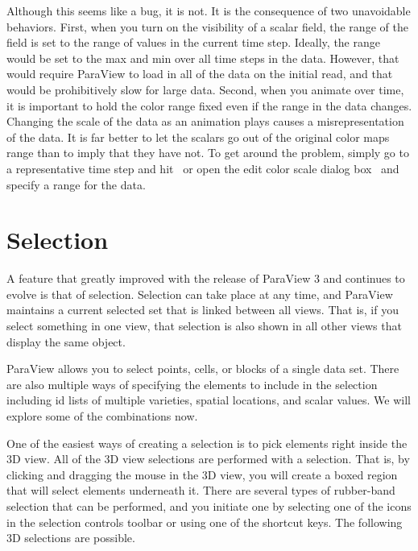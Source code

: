 Although this seems like a bug, it is not.  It is the consequence of two
unavoidable behaviors.  First, when you turn on the visibility of a scalar
field, the range of the field is set to the range of values in the current
time step.  Ideally, the range would be set to the max and min over all
time steps in the data.  However, that would require ParaView to load in
all of the data on the initial read, and that would be prohibitively slow
for large data.  Second, when you animate over time, it is important to
hold the color range fixed even if the range in the data changes.  Changing
the scale of the data as an animation plays causes a misrepresentation of
the data.  It is far better to let the scalars go out of the original color
maps range than to imply that they have not.  To get around the problem,
simply go to a representative time step and hit~ or
open the edit color scale dialog box~ and specify a
range for the data.


\section{Selection}

A feature that greatly improved with the release of ParaView 3 and
continues to evolve is that of selection.  Selection can take place at any
time, and ParaView maintains a current selected set that is linked between
all views.  That is, if you select something in one view, that selection is
also shown in all other views that display the same object.

ParaView allows you to select points, cells, or blocks of a single data
set.  There are also multiple ways of specifying the elements to include in
the selection including id lists of multiple varieties, spatial locations,
and scalar values.  We will explore some of the combinations now.

One of the easiest ways of creating a selection is to pick elements right
inside the 3D view.  All of the 3D view selections are performed with a
 selection.  That is, by clicking and dragging the
mouse in the 3D view, you will create a boxed region that will select
elements underneath it.  There are several types of rubber-band selection
that can be performed, and you initiate one by selecting one of the icons
in the selection controls toolbar or using one of the shortcut keys.  The
following 3D selections are possible.


